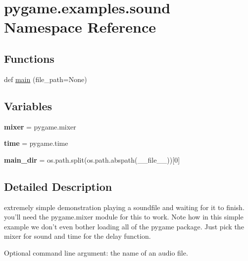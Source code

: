 \hypertarget{namespacepygame_1_1examples_1_1sound}{}\section{pygame.\+examples.\+sound Namespace Reference}
\label{namespacepygame_1_1examples_1_1sound}
\subsection*{Functions}
\begin{DoxyCompactItemize}
\item 
def \hyperlink{namespacepygame_1_1examples_1_1sound_a7cacd703564f154f8c2bed91901ed695}{main} (file\+\_\+path=None)
\end{DoxyCompactItemize}
\subsection*{Variables}
\begin{DoxyCompactItemize}
\item 
\mbox{\label{namespacepygame_1_1examples_1_1sound_a3ea288fbfa95156ab6742744d0cfa360}} 
{\bfseries mixer} = pygame.\+mixer
\item 
\mbox{\label{namespacepygame_1_1examples_1_1sound_a3b851e6264e349bf8b90475692ffa159}} 
{\bfseries time} = pygame.\+time
\item 
\mbox{\label{namespacepygame_1_1examples_1_1sound_adfa7738429d3c638707e083315d2d03c}} 
{\bfseries main\+\_\+dir} = os.\+path.\+split(os.\+path.\+abspath(\+\_\+\+\_\+file\+\_\+\+\_\+))\mbox{[}0\mbox{]}
\end{DoxyCompactItemize}


\subsection{Detailed Description}
\begin{DoxyVerb}extremely simple demonstration playing a soundfile
and waiting for it to finish. you'll need the pygame.mixer
module for this to work. Note how in this simple example we
don't even bother loading all of the pygame package. Just
pick the mixer for sound and time for the delay function.

Optional command line argument:
  the name of an audio file.\end{DoxyVerb}
 

